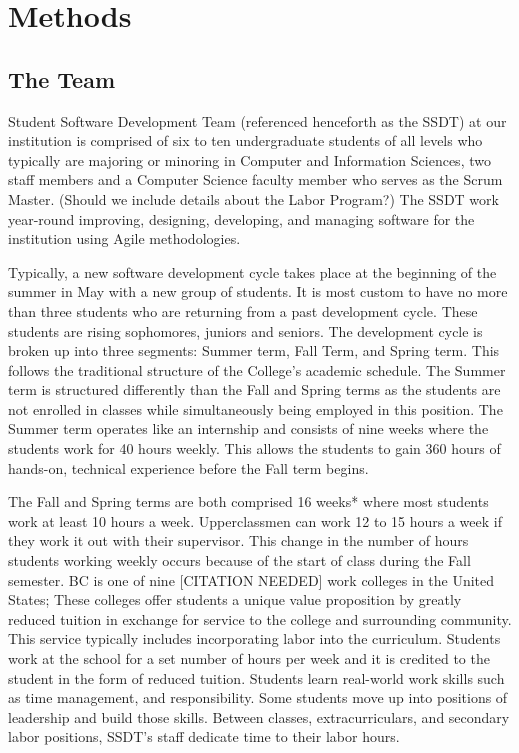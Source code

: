 \section{Methods}
\subsection{The Team}
Student Software Development Team (referenced henceforth as the SSDT) at our institution is comprised of six to ten undergraduate students of all levels who typically are majoring or minoring in Computer and Information Sciences, two staff members and a Computer Science faculty member who serves as the Scrum Master. (Should we include details about the Labor Program?) The SSDT work year-round improving, designing, developing, and managing software for the institution using Agile methodologies.

Typically, a new software development cycle takes place at the beginning of the summer in May with a new group of students. It is most custom to have no more than three students who are returning from a past development cycle. These students are rising sophomores, juniors and seniors. The development cycle is broken up into three segments: Summer term, Fall Term, and Spring term. This follows the traditional structure of the College's academic schedule. The Summer term is structured differently than the Fall and Spring terms as the students are not enrolled in classes while simultaneously being employed in this position. The Summer term operates like an internship and consists of nine weeks where the students work for 40 hours weekly. This allows the students to gain 360 hours of hands-on, technical experience before the Fall term begins. 

The Fall and Spring terms are both comprised 16 weeks* where most students work at least 10 hours a week. Upperclassmen can work 12 to 15 hours a week if they work it out with their supervisor. This change in the number of hours students working weekly occurs because of the start of class during the Fall semester. BC is one of nine [CITATION NEEDED] work colleges in the United States; These colleges offer students a unique value proposition by greatly reduced tuition in exchange for service to the college and surrounding community. This service typically includes incorporating labor into the curriculum. Students work at the school for a set number of hours per week and it is credited to the student in the form of reduced tuition. Students learn real-world work skills such as time management, and responsibility. Some students move up into positions of leadership and build those skills. Between classes, extracurriculars, and secondary labor positions, SSDT's staff dedicate time to their labor hours.


